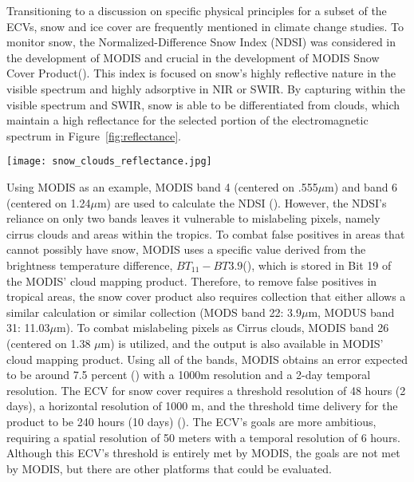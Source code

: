 \documentclass[12pt, letterpaper]{article}
\begin{document}
\begin{enumerate}
    \bigskip 
    Transitioning to a discussion on specific physical principles for a subset of the ECVs, snow and ice cover are frequently mentioned in climate change studies. To monitor snow, the Normalized-Difference Snow Index (NDSI) was considered in the development of MODIS and crucial in the development of MODIS Snow Cover Product(\cite{NDSI}). This index is focused on snow's highly reflective nature in the visible spectrum and highly adsorptive in NIR or SWIR. By capturing within the visible spectrum and SWIR, snow is able to be differentiated from clouds, which maintain a high reflectance for the selected portion of the electromagnetic spectrum in Figure~\ref{fig:reflectance}.
    
    \begin{center}
        \texttt{[image: snow\_clouds\_reflectance.jpg]}
    \end{center}
    \bigskip

    Using MODIS as an example, MODIS band 4 (centered on .555$\mu$m) and band 6 (centered on 1.24$\mu$m) are used to calculate the NDSI (\cite{snowcover}). However, the NDSI's reliance on only two bands leaves it vulnerable to mislabeling pixels, namely cirrus clouds and areas within the tropics. To combat false positives in areas that cannot possibly have snow, MODIS uses a specific value derived from the brightness temperature difference, $BT_11 - BT3.9$(\cite{atbd_snow}), which is stored in Bit 19 of the MODIS' cloud mapping product. Therefore, to remove false positives in tropical areas, the snow cover product also requires collection that either allows a similar calculation or similar collection (MODS band 22: 3.9$\mu$m, MODUS band 31: 11.03$\mu$m). To combat mislabeling pixels as Cirrus clouds, MODIS band 26 (centered on 1.38 $\mu$m) is utilized, and the output is also available in MODIS' cloud mapping product. Using all of the bands, MODIS obtains an error expected to be around 7.5 percent (\cite{snowcover}) with a 1000m resolution and a 2-day temporal resolution. The ECV for snow cover requires a threshold resolution of 48 hours (2 days), a horizontal resolution of 1000 m, and the threshold time delivery for the product to be 240 hours (10 days) (\cite{2022ecvs}). The ECV's goals are more ambitious, requiring a spatial resolution of 50 meters with a temporal resolution of 6 hours. Although this ECV's threshold is entirely met by MODIS, the goals are not met by MODIS, but there are other platforms that could be evaluated. 
    

\end{enumerate}
\end{document}
